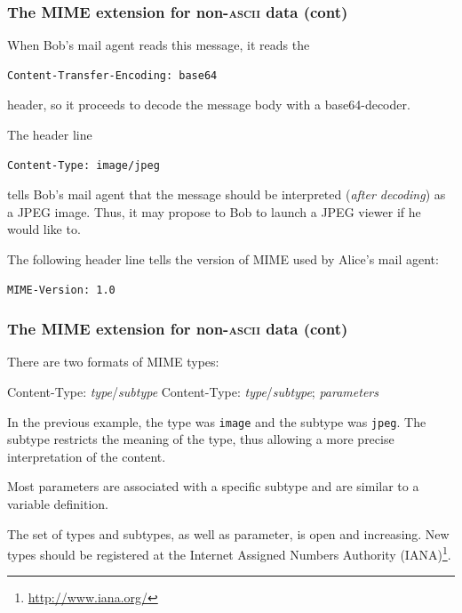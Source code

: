 %
\begin{frame}[containsverbatim]
\frametitle{The MIME extension for non-\textsc{ascii} data (cont)}

When Bob's mail agent reads this message, it reads the
{\small
\begin{verbatim}
Content-Transfer-Encoding: base64
\end{verbatim}
}
header, so it proceeds to decode the message body with a
base64-decoder.

The header line
{\small
\begin{verbatim}
Content-Type: image/jpeg
\end{verbatim}
}
tells Bob's mail agent that the message should be interpreted
(\emph{after decoding}) as a JPEG image. Thus, it may propose to Bob
to launch a JPEG viewer if he would like to.

The following header line tells the version of MIME used by Alice's
mail agent: {\small
\begin{verbatim}
MIME-Version: 1.0
\end{verbatim}
}

\end{frame}

%
\begin{frame}[containsverbatim]
\frametitle{The MIME extension for non-\textsc{ascii} data (cont)}

There are two formats of MIME types:
{\small
\begin{semiverbatim}
Content-Type: \emph{type}/\emph{subtype}
Content-Type: \emph{type}/\emph{subtype}; \emph{parameters}
\end{semiverbatim}
}
In the previous example, the type was \verb+image+ and the subtype was
\verb+jpeg+. The subtype restricts the meaning of the type, thus
allowing a more precise interpretation of the content.

Most parameters are associated with a specific subtype and are similar
to a variable definition.

The set of types and subtypes, as well as parameter, is open and
increasing. New types should be registered at the Internet Assigned
Numbers Authority (IANA)\footnote{\url{http://www.iana.org/}}.

\end{frame}


